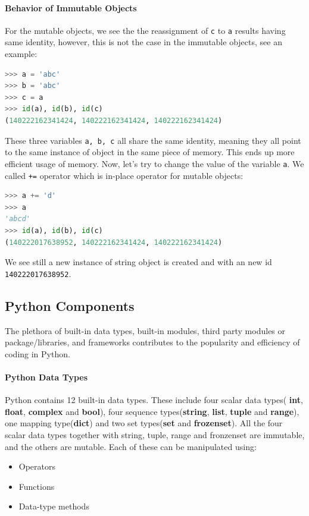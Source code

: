 \documentclass[../main.tex]{subfiles}
\begin{document}
\paragraph{Behavior of Immutable Objects} For the mutable objects, we see the the reassignment of \texttt{c} to \texttt{a} results having same identity, however, this is not the case in the immutable objects, see an example:
\begin{lstlisting}[language=Python]
>>> a = 'abc'
>>> b = 'abc'
>>> c = a
>>> id(a), id(b), id(c)
(140222162341424, 140222162341424, 140222162341424)
\end{lstlisting}
These three variables \texttt{a, b, c} all share the same identity, meaning they all point to the same instance of object in the same piece of memory. This ends up more efficient usage of memory. Now, let's try to change the value of the variable \texttt{a}. We called \texttt{+=} operator which is  in-place operator for mutable objects:
\begin{lstlisting}[language=Python]
>>> a += 'd'
>>> a
'abcd'
>>> id(a), id(b), id(c)
(140222017638952, 140222162341424, 140222162341424)
\end{lstlisting}
We see still a new instance of string object is created and with an new id \texttt{140222017638952}.

\subsection{Python Components}
\label{python_subsec_components}
The plethora of built-in data types, built-in modules, third party modules or package/libraries, and frameworks contributes to the popularity and efficiency of coding in Python. 

\paragraph{Python Data Types} Python contains 12 built-in data types. These include four scalar data types( \textbf{int}, \textbf{float}, \textbf{complex} and \textbf{bool}), four sequence types(\textbf{string}, \textbf{list}, \textbf{tuple} and \textbf{range}), one mapping type(\textbf{dict}) and two set types(\textbf{set} and \textbf{frozenset}).  All the four scalar data types together with string, tuple, range and fronzenset are immutable, and the others are mutable. Each of these can be manipulated using:
\begin{itemize}
    \item Operators
    \item Functions
    \item Data-type methods
\end{itemize}
\end{document}
